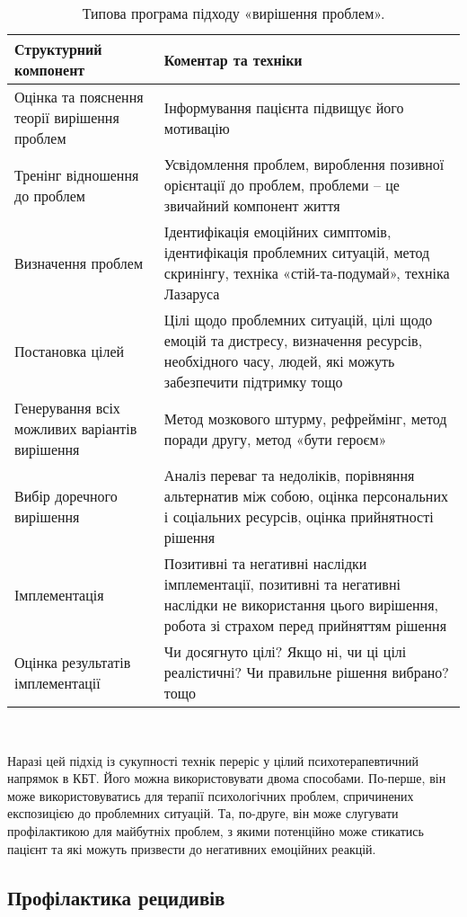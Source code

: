 \documentclass[twocolumn]{article}
\begin{document}
\begin{table*}
\caption{Типова програма підходу «вирішення проблем»\cite{bib24}.}
\label{tbl2}\centering
\begin{tabulary}{1.0\textwidth}{LL}
\toprule
Структурний компонент & Коментар та техніки \\ 
\midrule
Оцінка та пояснення теорії вирішення проблем & Інформування пацієнта підвищує його мотивацію \\ 
Тренінг відношення до проблем & Усвідомлення проблем, вироблення позивної орієнтації до проблем, проблеми – це звичайний компонент життя \\ 
Визначення проблем & Ідентифікація емоційних симптомів, ідентифікація проблемних ситуацій, метод скринінгу, техніка «стій-та-подумай», техніка Лазаруса \\ 
Постановка цілей & Цілі щодо проблемних ситуацій, цілі щодо емоцій та дистресу, визначення ресурсів, необхідного часу, людей, які можуть забезпечити підтримку тощо \\ 
Генерування всіх можливих варіантів вирішення & Метод мозкового штурму, рефреймінг, метод поради другу, метод «бути героєм» \\ 
Вибір доречного вирішення & Аналіз переваг та недоліків, порівняння альтернатив між собою, оцінка персональних і соціальних ресурсів, оцінка прийнятності рішення \\ 
Імплементація & Позитивні та негативні наслідки імплементації, позитивні та негативні наслідки не використання цього вирішення, робота зі страхом перед прийняттям рішення \\ 
Оцінка результатів імплементації & Чи досягнуто цілі? Якщо ні, чи ці цілі реалістичні? Чи правильне рішення вибрано? тощо \\ 
\bottomrule
\end{tabulary}
\\
\end{table*}
\par Наразі цей підхід із сукупності технік переріс у цілий психотерапевтичний напрямок в КБТ. Його можна використовувати двома способами. По-перше, він може використовуватись для терапії психологічних проблем, спричинених експозицією до проблемних ситуацій. Та, по-друге, він може слугувати профілактикою для майбутніх проблем, з якими потенційно може стикатись пацієнт та які можуть призвести до негативних емоційних реакцій.
\subsection{Профілактика рецидивів}
\end{document}

